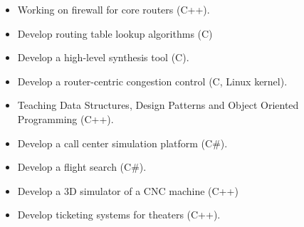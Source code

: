 \begin{itemize}
	\item Working on firewall for core routers (C++).
\end{itemize}

\divider

\begin{itemize}
	\item Develop routing table lookup algorithms (C)
	\item Develop a high-level synthesis tool (C).
	\item Develop a router-centric congestion control (C, Linux kernel).
	\item Teaching Data Structures, Design Patterns and Object Oriented Programming (C++).
\end{itemize}

\divider

\begin{itemize}
	\item Develop a call center simulation platform (C\#).
\end{itemize}

\divider

\begin{itemize}
	\item Develop a flight search (C\#).
\end{itemize}

\divider

\begin{itemize}
\item Develop a 3D simulator of a CNC machine (C++)
\end{itemize}

\divider

\begin{itemize}
	\item Develop ticketing systems for theaters (C++).
\end{itemize}

\divider


